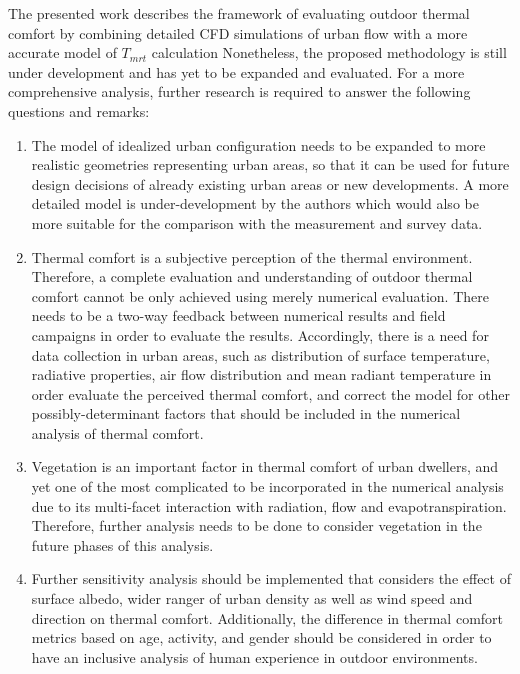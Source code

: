 \documentclass[smallextended]{svjour3}
\begin{document}
The presented work describes the framework of evaluating outdoor thermal comfort by combining detailed CFD simulations of urban flow with a more accurate model of $T_{mrt}$ calculation  Nonetheless, the proposed methodology is still under development and has yet to be expanded and evaluated. For a more comprehensive analysis, further research is required to answer the following questions and remarks:

\begin{enumerate}
\item The model of idealized urban configuration needs to be expanded to more realistic geometries representing urban areas, so that it can be used for future design decisions of already existing urban areas or new developments. A more detailed model is under-development by the authors which would also be more suitable for the comparison with the measurement and survey data.  
\item	Thermal comfort is a subjective perception of the thermal environment. Therefore, a complete evaluation and understanding of outdoor thermal comfort cannot be only achieved using merely numerical evaluation. There needs to be a two-way feedback between numerical results and field campaigns in order to evaluate the results. Accordingly, there is a need for data collection in urban areas, such as distribution of surface temperature, radiative properties, air flow distribution and mean radiant temperature in order evaluate the perceived thermal comfort, and correct the model for other possibly-determinant factors that should be included in the numerical analysis of thermal comfort. 
\item	Vegetation is an important factor in thermal comfort of urban dwellers, and yet one of the most complicated to be incorporated in the numerical analysis due to its multi-facet interaction with radiation, flow and evapotranspiration.  Therefore, further analysis needs to be done to consider vegetation in the future phases of this analysis.
\item	Further sensitivity analysis should be implemented that considers the effect of surface albedo, wider ranger of urban density as well as wind speed and direction on thermal comfort.  Additionally, the difference in thermal comfort metrics based on age, activity, and gender should be considered in order to have an inclusive analysis of human experience in outdoor environments. 
\end{enumerate}	



{\tiny }

\end{document}
